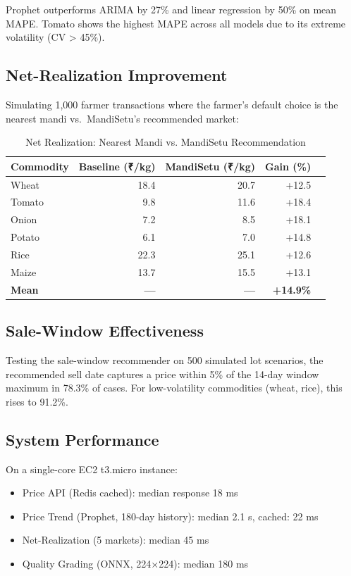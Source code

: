 \documentclass[conference]{IEEEtran}
\begin{document}
Prophet outperforms ARIMA by 27\% and linear regression by 50\% on mean MAPE. Tomato shows the highest MAPE across all models due to its extreme volatility (CV > 45\%).

\subsection{Net-Realization Improvement}

Simulating 1,000 farmer transactions where the farmer's default choice is the nearest mandi vs.\ MandiSetu's recommended market:

\begin{table}[h]
\caption{Net Realization: Nearest Mandi vs. MandiSetu Recommendation}
\label{tab:netreal}
\begin{center}
\begin{tabular}{lrrrr}
\toprule
\textbf{Commodity} & \textbf{Baseline (₹/kg)} & \textbf{MandiSetu (₹/kg)} & \textbf{Gain (\%)} \\
\midrule
Wheat  & 18.4 & 20.7 & +12.5 \\
Tomato & 9.8  & 11.6 & +18.4 \\
Onion  & 7.2  & 8.5  & +18.1 \\
Potato & 6.1  & 7.0  & +14.8 \\
Rice   & 22.3 & 25.1 & +12.6 \\
Maize  & 13.7 & 15.5 & +13.1 \\
\midrule
\textbf{Mean} & \textbf{—} & \textbf{—} & \textbf{+14.9\%} \\
\bottomrule
\end{tabular}
\end{center}
\end{table}

\subsection{Sale-Window Effectiveness}
Testing the sale-window recommender on 500 simulated lot scenarios, the recommended sell date captures a price within 5\% of the 14-day window maximum in 78.3\% of cases. For low-volatility commodities (wheat, rice), this rises to 91.2\%.

\subsection{System Performance}
On a single-core EC2 t3.micro instance:
\begin{itemize}
\item Price API (Redis cached): median response 18 ms
\item Price Trend (Prophet, 180-day history): median 2.1 s, cached: 22 ms
\item Net-Realization (5 markets): median 45 ms
\item Quality Grading (ONNX, 224×224): median 180 ms
\end{itemize}
\end{document}
